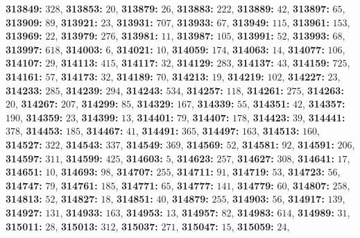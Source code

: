 \textsf{\bfseries 313849:} $328$, \textsf{\bfseries 313853:} $20$, \textsf{\bfseries 313879:} $26$, \textsf{\bfseries 313883:} $222$, \textsf{\bfseries 313889:} $42$, \textsf{\bfseries 313897:} $65$, \textsf{\bfseries 313909:} $89$, \textsf{\bfseries 313921:} $23$, \textsf{\bfseries 313931:} $707$, \textsf{\bfseries 313933:} $67$, \textsf{\bfseries 313949:} $115$, \textsf{\bfseries 313961:} $153$, \textsf{\bfseries 313969:} $22$, \textsf{\bfseries 313979:} $276$, \textsf{\bfseries 313981:} $11$, \textsf{\bfseries 313987:} $105$, \textsf{\bfseries 313991:} $52$, \textsf{\bfseries 313993:} $68$, \textsf{\bfseries 313997:} $618$, \textsf{\bfseries 314003:} $6$, \textsf{\bfseries 314021:} $10$, \textsf{\bfseries 314059:} $174$, \textsf{\bfseries 314063:} $14$, \textsf{\bfseries 314077:} $106$, \textsf{\bfseries 314107:} $29$, \textsf{\bfseries 314113:} $415$, \textsf{\bfseries 314117:} $32$, \textsf{\bfseries 314129:} $283$, \textsf{\bfseries 314137:} $43$, \textsf{\bfseries 314159:} $725$, \textsf{\bfseries 314161:} $57$, \textsf{\bfseries 314173:} $32$, \textsf{\bfseries 314189:} $70$, \textsf{\bfseries 314213:} $19$, \textsf{\bfseries 314219:} $102$, \textsf{\bfseries 314227:} $23$, \textsf{\bfseries 314233:} $285$, \textsf{\bfseries 314239:} $294$, \textsf{\bfseries 314243:} $534$, \textsf{\bfseries 314257:} $118$, \textsf{\bfseries 314261:} $275$, \textsf{\bfseries 314263:} $20$, \textsf{\bfseries 314267:} $207$, \textsf{\bfseries 314299:} $85$, \textsf{\bfseries 314329:} $167$, \textsf{\bfseries 314339:} $55$, \textsf{\bfseries 314351:} $42$, \textsf{\bfseries 314357:} $190$, \textsf{\bfseries 314359:} $23$, \textsf{\bfseries 314399:} $13$, \textsf{\bfseries 314401:} $79$, \textsf{\bfseries 314407:} $178$, \textsf{\bfseries 314423:} $39$, \textsf{\bfseries 314441:} $378$, \textsf{\bfseries 314453:} $185$, \textsf{\bfseries 314467:} $41$, \textsf{\bfseries 314491:} $365$, \textsf{\bfseries 314497:} $163$, \textsf{\bfseries 314513:} $160$, \textsf{\bfseries 314527:} $322$, \textsf{\bfseries 314543:} $337$, \textsf{\bfseries 314549:} $369$, \textsf{\bfseries 314569:} $52$, \textsf{\bfseries 314581:} $92$, \textsf{\bfseries 314591:} $206$, \textsf{\bfseries 314597:} $311$, \textsf{\bfseries 314599:} $425$, \textsf{\bfseries 314603:} $5$, \textsf{\bfseries 314623:} $257$, \textsf{\bfseries 314627:} $308$, \textsf{\bfseries 314641:} $17$, \textsf{\bfseries 314651:} $10$, \textsf{\bfseries 314693:} $98$, \textsf{\bfseries 314707:} $255$, \textsf{\bfseries 314711:} $91$, \textsf{\bfseries 314719:} $53$, \textsf{\bfseries 314723:} $56$, \textsf{\bfseries 314747:} $79$, \textsf{\bfseries 314761:} $185$, \textsf{\bfseries 314771:} $65$, \textsf{\bfseries 314777:} $141$, \textsf{\bfseries 314779:} $60$, \textsf{\bfseries 314807:} $258$, \textsf{\bfseries 314813:} $52$, \textsf{\bfseries 314827:} $18$, \textsf{\bfseries 314851:} $40$, \textsf{\bfseries 314879:} $255$, \textsf{\bfseries 314903:} $56$, \textsf{\bfseries 314917:} $139$, \textsf{\bfseries 314927:} $131$, \textsf{\bfseries 314933:} $163$, \textsf{\bfseries 314953:} $13$, \textsf{\bfseries 314957:} $82$, \textsf{\bfseries 314983:} $614$, \textsf{\bfseries 314989:} $31$, \textsf{\bfseries 315011:} $28$, \textsf{\bfseries 315013:} $312$, \textsf{\bfseries 315037:} $271$, \textsf{\bfseries 315047:} $15$, \textsf{\bfseries 315059:} $24$, 
